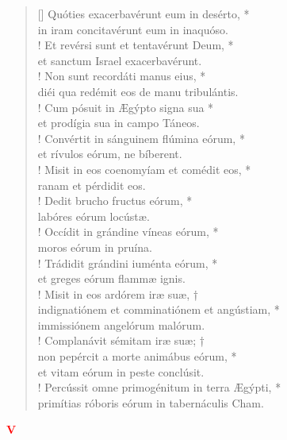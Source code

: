 \begin{verse}[\versewidth]
Quóties exacerbavérunt eum in desérto, *\\
in iram concitavérunt eum in inaquóso.\\!
\vin Et revérsi sunt et tentavérunt Deum, *\\
\vin et sanctum Israel exacerbavérunt.\\!
Non sunt recordáti manus eius, *\\
diéi qua redémit eos de manu tribulántis.\\!
\vin Cum pósuit in Ægýpto signa sua *\\
\vin et prodígia sua in campo Táneos.\\!
Convértit in sánguinem flúmina eórum, *\\
et rívulos eórum, ne bíberent.\\!
\vin Misit in eos coenomyíam et comédit eos, *\\
\vin ranam et pérdidit eos.\\!
Dedit brucho fructus eórum, *\\
labóres eórum locústæ.\\!
\vin Occídit in grándine víneas eórum, *\\
\vin moros eórum in pruína.\\!
Trádidit grándini iuménta eórum, *\\
et greges eórum flammæ ignis.\\!
\vin Misit in eos ardórem iræ suæ, †\\
\vin indignatiónem et comminatiónem et angústiam, *\\
\vin immissiónem angelórum malórum.\\!
Complanávit sémitam iræ suæ; †\\
non pepércit a morte animábus eórum, *\\
et vitam eórum in peste conclúsit.\\!
\vin Percússit omne primogénitum in terra Ægýpti, *\\
\vin primítias róboris eórum in tabernáculis Cham.\\
\end{verse}
\begin{center}
\textcolor{red}{\large \bf V}\\
\end{center}
